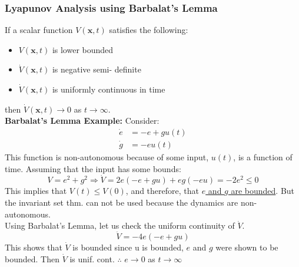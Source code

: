 \documentclass[11pt,handout]{beamer}   %
\begin{document}
\begin{frame}
\frametitle{Lyapunov Analysis using Barbalat's Lemma}
\footnotesize
If a scalar function $V(\mathbf{x},t)$ satisfies the following:
\begin{itemize}
\item $V(\mathbf{x},t)$ is lower bounded
\item $\dot{V}(\mathbf{x},t)$ is negative semi- definite
\item $\dot{V}(\mathbf{x},t)$ is uniformly continuous in time
\end{itemize}
then $\dot{V}(\mathbf{x},t) \rightarrow 0$ as $t \rightarrow \infty$.\\
\vspace{6pt}
\textbf{Barbalat's Lemma Example:} Consider:
\begin{equation*}
\begin{aligned}
\dot{e} &= -e + g u(t)\\
\dot{g} &= -e u(t)
\end{aligned}
\end{equation*}
This function is non-autonomous because of some input, $u(t)$, is a function of time. Assuming that the input has some bounds:
\begin{equation*}
V = e^2 + g^2 \Rightarrow \dot{V} = 2e(-e+gu) + eg(-eu) = -2e^2 \leq 0
\end{equation*}
This implies that $V(t) \leq V(0)$, and therefore, that \underline{$e$ and $g$ are bounded}. But the invariant set thm. can not be used because the dynamics are non-autonomous.\\
Using Barbalat's Lemma, let us check the uniform continuity of $\dot{V}$.
\begin{equation*}
\ddot{V} = -4e(-e+gu)
\end{equation*}
This shows that $\dot{V}$ is bounded since u is bounded, $e$ and $g$ were shown to be bounded. Then $\dot{V}$ is unif. cont. $\therefore$ $e \rightarrow 0 $ as $t \rightarrow \infty$
\end{frame}
\end{document}
